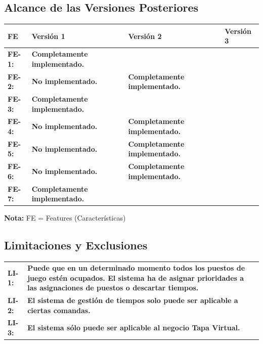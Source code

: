 \documentclass[a4paper,11pt]{article}
\begin{document}
		\subsection{Alcance de las Versiones Posteriores}
			\begin{center}
				\begin{tabular}{| l | p{3cm} | p{3cm} | p{3cm} |}
					\hline
					\cellcolor[RGB]{224,233,250}\textbf{FE} & \cellcolor[RGB]{224,233,250}\textbf{Versión 1} & 							\cellcolor[RGB]{224,233,250}\textbf{Versión 2} & \cellcolor[RGB]{224,233,250}\textbf{Versión 3} 							\\
					\hline
					\textbf{FE-1:} & \textbf{Completamente implementado.} & &  \\
					\hline
					\textbf{FE-2:} & \textbf{No implementado.} & 														\textbf{Completamente implementado.} &  \\
					\hline
					\textbf{FE-3:} & \textbf{Completamente implementado.} & &  \\
					\hline
					\textbf{FE-4:} & \textbf{No implementado.} & \textbf{Completamente implementado.} &  \\
					\hline
					\textbf{FE-5:} & \textbf{No implementado.} & \textbf{Completamente implementado.} &  \\
					\hline
					\textbf{FE-6:} & \textbf{No implementado.} & \textbf{Completamente implementado.} &  \\
					\hline
					\textbf{FE-7:} & \textbf{Completamente implementado.} & &  \\
					\hline
				\end{tabular}
			\end{center}
			\textbf{Nota:} FE = Features (Características)
		\subsection{Limitaciones y Exclusiones}
			\begin{center}
				\begin{tabular}{l p{11cm}}
					\textbf{LI-1:} & \textbf{Puede que en un determinado momento todos los puestos de juego estén 											ocupados. El sistema ha de asignar prioridades a las asignaciones de 											puestos o descartar tiempos.}\\
					\textbf{LI-2:} & \textbf{El sistema de gestión de tiempos solo puede ser aplicable a ciertas 												comandas.} \\
					\textbf{LI-3:} & \textbf{El sistema sólo puede ser aplicable al negocio Tapa Virtual.} \\
				\end{tabular}
			\end{center}
\end{document}

